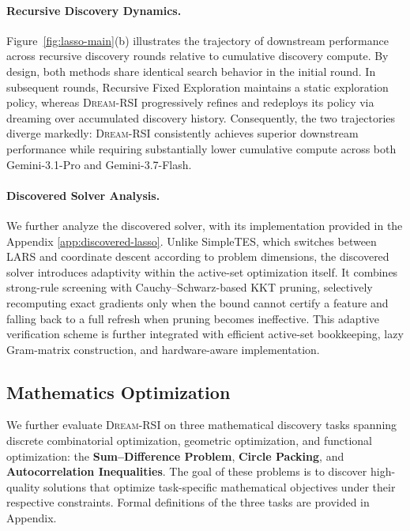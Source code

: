 \paragraph{Recursive Discovery Dynamics.}
Figure~\ref{fig:lasso-main}(b) illustrates the trajectory of downstream performance across recursive discovery rounds relative to cumulative discovery compute. By design, both methods share identical search behavior in the initial round. In subsequent rounds, Recursive Fixed Exploration maintains a static exploration policy, whereas \textsc{Dream-RSI} progressively refines and redeploys its policy via dreaming over accumulated discovery history. Consequently, the two trajectories diverge markedly: \textsc{Dream-RSI} consistently achieves superior downstream performance while requiring substantially lower cumulative compute across both Gemini-3.1-Pro and Gemini-3.7-Flash.


\paragraph{Discovered Solver Analysis.}
We further analyze the discovered solver, with its implementation provided in
the Appendix \ref{app:discovered-lasso}. Unlike SimpleTES, which switches between LARS and coordinate
descent according to problem dimensions, the discovered solver introduces
adaptivity within the active-set optimization itself. It combines strong-rule
screening with Cauchy--Schwarz-based KKT pruning, selectively recomputing exact
gradients only when the bound cannot certify a feature and falling back to a
full refresh when pruning becomes ineffective. This adaptive verification
scheme is further integrated with efficient active-set bookkeeping, lazy
Gram-matrix construction, and hardware-aware implementation.


\subsection{Mathematics Optimization}

We further evaluate \textsc{Dream-RSI} on three mathematical discovery tasks spanning discrete combinatorial optimization, geometric optimization, and functional optimization: the \textbf{Sum--Difference Problem}, \textbf{Circle Packing}, and \textbf{Autocorrelation Inequalities}. The goal of these problems is to discover high-quality solutions that optimize task-specific mathematical objectives under their respective constraints. Formal definitions of the three tasks are provided in Appendix.

